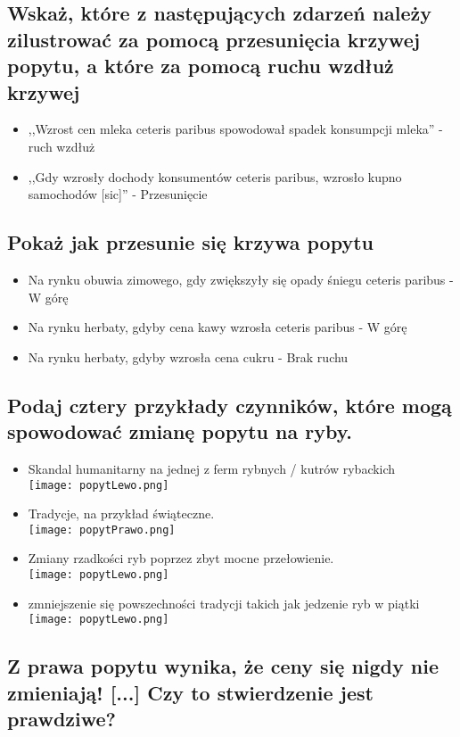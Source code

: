 \documentclass[a4paper,12pt]{article}
\newcommand{\popytLewo}{\\\texttt{[image: popytLewo.png]}}
\newcommand{\popytPrawo}{\\\texttt{[image: popytPrawo.png]}}
\begin{document}
\subsection{Wskaż, które z następujących zdarzeń należy zilustrować za pomocą przesunięcia krzywej popytu, a które za pomocą ruchu wzdłuż krzywej}

\begin{itemize}
	\item ,,Wzrost cen mleka ceteris paribus spowodował spadek konsumpcji mleka'' - ruch wzdłuż
	\item ,,Gdy wzrosły dochody konsumentów ceteris paribus, wzrosło kupno samochodów [sic]'' - Przesunięcie
\end{itemize}

\subsection{Pokaż jak przesunie się krzywa popytu}

\begin{itemize}
	\item Na rynku obuwia zimowego, gdy zwiększyły się opady śniegu ceteris paribus - W górę
	\item Na rynku herbaty, gdyby cena kawy wzrosła ceteris paribus - W górę
	\item Na rynku herbaty, gdyby wzrosła cena cukru - Brak ruchu
\end{itemize}

\subsection{Podaj cztery przykłady czynników, które mogą spowodować zmianę popytu na ryby.}

\begin{itemize}
	\item Skandal humanitarny na jednej z ferm rybnych / kutrów rybackich \popytLewo
	\item Tradycje, na przykład świąteczne. \popytPrawo
	\item Zmiany rzadkości ryb poprzez zbyt mocne przełowienie. \popytLewo
	\item zmniejszenie się powszechności tradycji takich jak jedzenie ryb w piątki \popytLewo
\end{itemize}

\subsection{Z prawa popytu wynika, że ceny się nigdy nie zmieniają! [...] Czy to stwierdzenie jest prawdziwe?}
\end{document}
